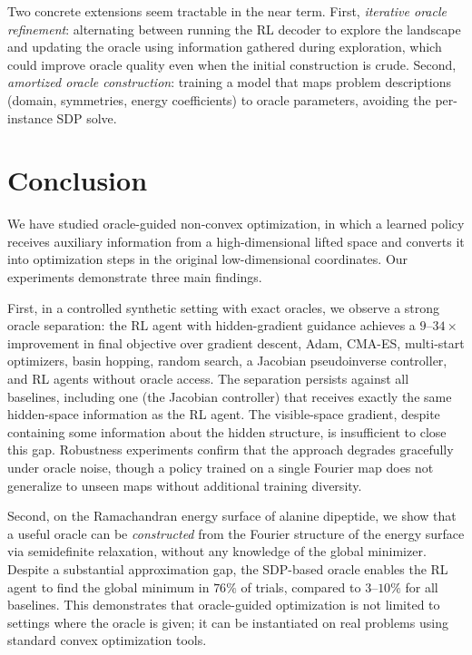\documentclass[10pt]{article}
\theoremstyle{definition}
\begin{document}
Two concrete extensions seem tractable in the near term. First, \emph{iterative oracle refinement}: alternating between running the RL decoder to explore the landscape and updating the oracle using information gathered during exploration, which could improve oracle quality even when the initial construction is crude. Second, \emph{amortized oracle construction}: training a model that maps problem descriptions (domain, symmetries, energy coefficients) to oracle parameters, avoiding the per-instance SDP solve.

\section{Conclusion}

We have studied oracle-guided non-convex optimization, in which a learned policy receives auxiliary information from a high-dimensional lifted space and converts it into optimization steps in the original low-dimensional coordinates. Our experiments demonstrate three main findings.

First, in a controlled synthetic setting with exact oracles, we observe a strong oracle separation: the RL agent with hidden-gradient guidance achieves a $9$--$34\times$ improvement in final objective over gradient descent, Adam, CMA-ES, multi-start optimizers, basin hopping, random search, a Jacobian pseudoinverse controller, and RL agents without oracle access. The separation persists against all baselines, including one (the Jacobian controller) that receives exactly the same hidden-space information as the RL agent. The visible-space gradient, despite containing some information about the hidden structure, is insufficient to close this gap. Robustness experiments confirm that the approach degrades gracefully under oracle noise, though a policy trained on a single Fourier map does not generalize to unseen maps without additional training diversity.

Second, on the Ramachandran energy surface of alanine dipeptide, we show that a useful oracle can be \emph{constructed} from the Fourier structure of the energy surface via semidefinite relaxation, without any knowledge of the global minimizer. Despite a substantial approximation gap, the SDP-based oracle enables the RL agent to find the global minimum in $76\%$ of trials, compared to $3$--$10\%$ for all baselines. This demonstrates that oracle-guided optimization is not limited to settings where the oracle is given; it can be instantiated on real problems using standard convex optimization tools.
\end{document}
